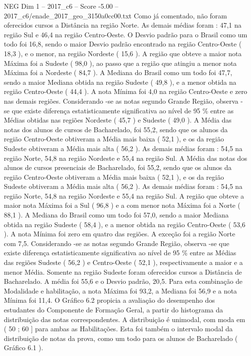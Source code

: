 \begin{textsample}{NEG Dim 1 – 2017\_c6 – Score -5.00 – 2017\_c6/enade\_2017\_geo\_3150a0cc00.txt}
Como já comentado, não foram oferecidos cursos a Distância na região Norte.
As demais médias foram : 47,1 na região Sul e 46,4 na região Centro-Oeste.
O Desvio padrão para o Brasil como um todo foi 16,8, sendo o maior Desvio padrão encontrado na região Centro-Oeste ( 18,3 ), e o menor, na região Nordeste ( 15,6 ).
A região que obteve a maior nota Máxima foi a Sudeste ( 98,0 ), ao passo que a região que atingiu a menor nota Máxima foi a Nordeste ( 84,7 ).
A Mediana do Brasil como um todo foi 47,7, sendo a maior Mediana obtida na região Sudeste ( 49,8 ), e a menor obtida na região Centro-Oeste ( 44,4 ).
A nota Mínima foi 4,0 na região Centro-Oeste e zero nas demais regiões.
Considerando -se as notas segundo Grande Região, observa -se que existe diferença estatisticamente significativa ao nível de 95 \% entre as Médias obtidas nas regiões Nordeste ( 45,7 ) e Sudeste ( 49,0 ).
A Média das notas dos alunos de cursos de Bacharelado, foi 55,2, sendo que os alunos da região Centro-Oeste obtiveram a Média mais baixa ( 52,1 ), e os da região Sudeste obtiveram a Média mais alta ( 56,2 ).
As demais médias foram : 54,5 na região Norte, 54,8 na região Nordeste e 55,4 na região Sul.
A Média das notas dos alunos de cursos presenciais de Bacharelado, foi 55,2, sendo que os alunos da região Centro-Oeste obtiveram a Média mais baixa ( 52,1 ), e os da região Sudeste obtiveram a Média mais alta ( 56,2 ).
As demais médias foram : 54,5 na região Norte, 54,8 na região Nordeste e 55,4 na região Sul.
A região que obteve a maior nota Máxima foi a Sul ( 96,8 ) e a com menor nota Máxima foi a Norte ( 88,1 ).
A Mediana do Brasil como um todo foi 57,0, sendo a maior Mediana obtida na região Sudeste ( 58,4 ), e a menor obtida na região Centro-Oeste ( 53,6 ).
A nota Mínima foi zero em quatro das regiões.
A exceção foi a região Norte com 7,5.
Considerando -se as notas segundo Grande Região, observa -se que existe diferença estatisticamente significativa ao nível de 95 \% entre as Médias das regiões Sudeste ( 56,2 ) e Centro-Oeste ( 52,1 ), respectivamente a maior e a menor Média.
Somente na região Sudeste foram oferecidos cursos a Distância de Bacharelado.
A média foi 55,6 e o Desvio padrão, 20,5.
Para esta combinação de Modalidade e habilitação, a nota Máxima foi 93,2, a Mediana foi 56,9 e a nota Mínima foi 11,4.
O Gráfico 6.2 propicia a avaliação do desempenho dos estudantes do Componente de Formação Geral, a partir do histograma da distribuição das notas correspondentes.
A distribuição é unimodal, com moda em ( 50 ; 60 ] para ambas as Habilitações.
Esta foi também o intervalo modal da distribuição de notas da prova, como um todo para os alunos de Bacharelado ( Gráfico 6.1 ).

\end{textsample}
